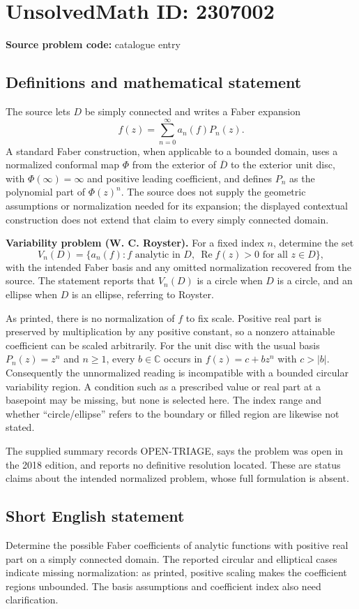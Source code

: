 \documentclass[11pt]{article}
\newcommand{\C}{\mathbb{C}}
\begin{document}
\section*{UnsolvedMath ID: 2307002}
\textbf{Source problem code:} catalogue entry
\subsection{Definitions and mathematical statement}
The source lets $D$ be simply connected and writes a Faber expansion
\[
 f(z)=\sum_{n=0}^{\infty}a_n(f)P_n(z).
\]
A standard Faber construction, when applicable to a bounded domain, uses a normalized conformal map $\Phi$ from the exterior of $\overline D$ to the exterior unit disc, with $\Phi(\infty)=\infty$ and positive leading coefficient, and defines $P_n$ as the polynomial part of $\Phi(z)^n$. The source does not supply the geometric assumptions or normalization needed for its expansion; the displayed contextual construction does not extend that claim to every simply connected domain.

\textbf{Variability problem (W. C. Royster).} For a fixed index $n$, determine the set
\[
 V_n(D)=\{a_n(f):f\text{ analytic in }D,\ \operatorname{Re}f(z)>0\text{ for all }z\in D\},
\]
with the intended Faber basis and any omitted normalization recovered from the source. The statement reports that $V_n(D)$ is a circle when $D$ is a circle, and an ellipse when $D$ is an ellipse, referring to Royster.

As printed, there is no normalization of $f$ to fix scale. Positive real part is preserved by multiplication by any positive constant, so a nonzero attainable coefficient can be scaled arbitrarily. For the unit disc with the usual basis $P_n(z)=z^n$ and $n\geq1$, every $b\in\C$ occurs in $f(z)=c+bz^n$ with $c>|b|$. Consequently the unnormalized reading is incompatible with a bounded circular variability region. A condition such as a prescribed value or real part at a basepoint may be missing, but none is selected here. The index range and whether ``circle/ellipse'' refers to the boundary or filled region are likewise not stated.

The supplied summary records OPEN-TRIAGE, says the problem was open in the 2018 edition, and reports no definitive resolution located. These are status claims about the intended normalized problem, whose full formulation is absent.
\subsection{Short English statement}
Determine the possible Faber coefficients of analytic functions with positive real part on a simply connected domain. The reported circular and elliptical cases indicate missing normalization: as printed, positive scaling makes the coefficient regions unbounded. The basis assumptions and coefficient index also need clarification.
\end{document}
